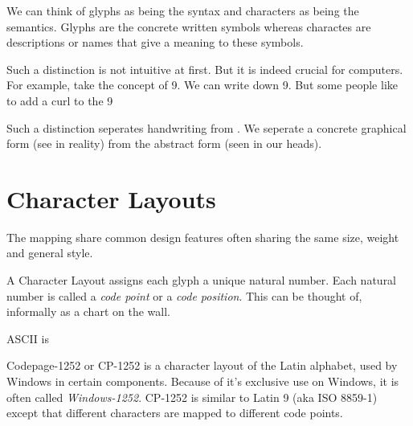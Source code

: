 \frmrule

We can think of glyphs as being the syntax and characters as being the semantics.
Glyphs are the concrete written symbols whereas charactes are descriptions or names 
that give a meaning to these symbols. 


Such a distinction is not intuitive at first. But it is indeed crucial for computers. 
For example, take the concept of 9. We can write down 9. But some people like to 
add a curl to the 9

Such a distinction seperates handwriting from . 
We seperate a concrete graphical form (see in reality) 
from the abstract form (seen in our heads). 








\section{Character Layouts}


The mapping share common design features often sharing 
the same size, weight and general style.



A Character Layout assigns each glyph a unique natural number.
Each natural number is called a \textit{code point} or a \textit{code position}. 
This can be thought of, informally as a chart on the wall. 



\begin{example}
ASCII is 
\end{example}

\frmrule 

\begin{example}
Codepage-1252 or CP-1252 is a character layout of the Latin alphabet, 
used by Windows in certain components. Because of it's exclusive use on Windows, 
it is often called  \textit{Windows-1252}. 
CP-1252 is similar to Latin 9 (aka ISO 8859-1) except that different characters 
are mapped to different code points. 
\end{example}

